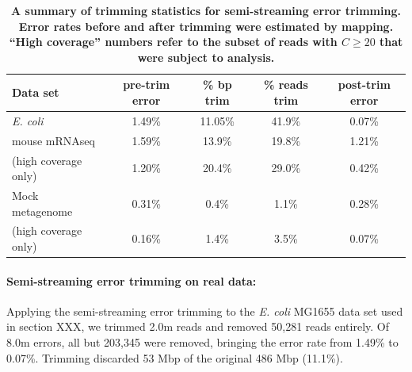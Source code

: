 \documentclass{article}
\begin{document}
\begin{table}
\begin{tabular}{|l|c|c|c|c|}
\hline
Data set        & pre-trim error & \% bp trim & \% reads trim & post-trim error \\
\hline
{\em E. coli}   & 1.49\%         & 11.05\%          & 41.9\%      & 0.07\% \\
\hline
mouse mRNAseq   & 1.59\%         & 13.9\%           & 19.8\%      & 1.21\% \\
(high coverage only) & 1.20\%    & 20.4\%           & 29.0\%      & 0.42\% \\
\hline
Mock metagenome & 0.31\%         & 0.4\%            & 1.1\%       & 0.28\% \\
(high coverage only) & 0.16\%    & 1.4\%            & 3.5\%       & 0.07\% \\
\hline
\end{tabular}

\caption{{\bf A summary of trimming statistics for semi-streaming
    error trimming.  Error rates before and after trimming were
    estimated by mapping. ``High coverage'' numbers refer to the
    subset of reads with $C \geq 20$ that were subject to analysis.}}
\label{tab:trimming}
\end{table}

\paragraph{Semi-streaming error trimming on real data:}



%

Applying the semi-streaming error trimming to the {\em E. coli} MG1655 data
set used in section XXX, we trimmed 2.0m reads and removed 50,281
reads entirely.  Of 8.0m errors, all but 203,345 were removed,
bringing the error rate from 1.49\% to 0.07\%.  Trimming discarded 53
Mbp of the original 486 Mbp (11.1\%).
\end{document}
